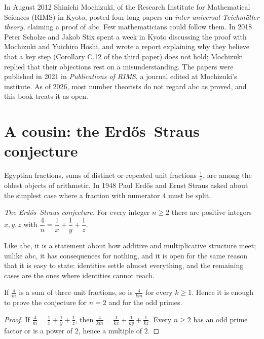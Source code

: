 \begin{remark}\label{conjectures:rem:mochizuki}
In August 2012 Shinichi Mochizuki, of the Research Institute for Mathematical Sciences (RIMS) in Kyoto, posted four long papers on
\emph{inter-universal Teichm\"uller theory}, claiming a proof of abc. Few mathematicians could follow them. In 2018 Peter Scholze and Jakob Stix
spent a week in Kyoto discussing the proof with Mochizuki and Yuichiro Hoshi, and wrote a report explaining why they believe that a key step (Corollary
C.12 of the third paper) does not hold; Mochizuki replied that their objections rest on a misunderstanding. The papers were published in 2021 in
\emph{Publications of RIMS}, a journal edited at Mochizuki's institute. As of 2026, most number theorists do not regard abc as proved, and this book
treats it as open.
\end{remark}

\section{A cousin: the Erd\H os--Straus conjecture}

Egyptian fractions, sums of distinct or repeated unit fractions $\frac1x$, are among the oldest objects of arithmetic. In 1948 Paul Erd\H os and Ernst
Straus asked about the simplest case where a fraction with numerator $4$ must be split.

\begin{center}
\emph{The Erd\H os--Straus conjecture.} For every integer $n\ge2$ there are positive integers $x,y,z$ with $\dfrac4n=\dfrac1x+\dfrac1y+\dfrac1z$.
\end{center}

Like abc, it is a statement about how additive and multiplicative structure meet; unlike abc, it has consequences for nothing, and it is open for the
same reason that it is easy to state: identities settle almost everything, and the remaining cases are the ones where identities cannot reach.

\begin{proposition}\label{conjectures:prop:esreduce}
If $\frac4m$ is a sum of three unit fractions, so is $\frac4{km}$ for every $k\ge1$. Hence it is enough to prove the conjecture for $n=2$ and for the
odd primes.
\end{proposition}
\begin{proof}
If $\frac4m=\frac1x+\frac1y+\frac1z$, then $\frac4{km}=\frac1{kx}+\frac1{ky}+\frac1{kz}$. Every $n\ge2$ has an odd prime factor or is a power of $2$, hence a
multiple of $2$.
\end{proof}

